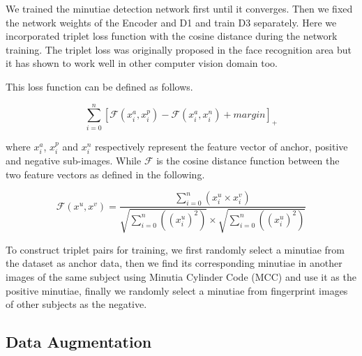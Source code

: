 We trained the minutiae detection network first until it converges.
Then we fixed the network weights of the Encoder and D1 and train D3 separately.
Here we incorporated triplet loss function with the cosine distance during the network training.
The triplet loss \cite{FaceNet} was originally proposed in the face recognition area but it has shown to work well in other computer vision domain too.

This loss function can be defined as follows.

\def \newf {\mathcal{F}}

\begin{equation}
	\sum_{i=0}^{n}[\newf(x_i^a, x_i^p) - \newf(x_i^a, x_i^n) + margin]_+
	\label{for:triplet-loss}
\end{equation}

where $x_i^a$, $x_i^p$ and $x_i^n$ respectively represent the feature vector of anchor, positive and negative sub-images.
While $\newf$ is the cosine distance function between the two feature vectors as defined in the following.

\begin{equation}
	\newf(x^u, x^v) = \frac{\sum_{i=0}^{n}(x_i^u \times x_i^v)}{\sqrt{\sum_{i=0}^{n}((x^u_i)^2)} \times \sqrt{\sum_{i=0}^{n}((x_i^u)^2)}}
	\label{for:cos-triplet-loss}
\end{equation}

To construct triplet pairs for training, we first randomly select a minutiae from the dataset as anchor data, then we find its corresponding minutiae in another images of the same subject using Minutia Cylinder Code (MCC) \cite{MCC} and use it as the positive minutiae, finally we randomly select a minutiae from fingerprint images of other subjects as the negative.


\subsection{Data Augmentation}

